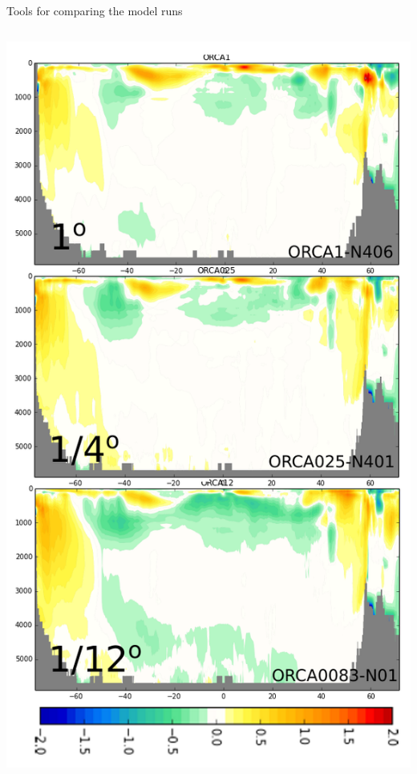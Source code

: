 \documentclass{beamer}
\begin{document}

\begin{frame}{Tools for comparing the model runs}
\begin{columns}[c]
\column{1.7in}
 \includegraphics[width=1\textwidth]{MOC_biasPrez2.png}\\

\end{columns}
\end{frame}
\end{document}
